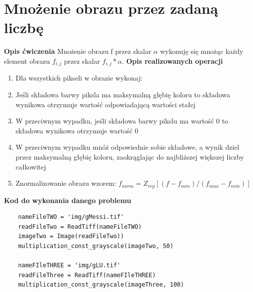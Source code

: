 \documentclass[magisterska,openany]{pracadypl}
\begin{document}
\newpage
\section{Mnożenie obrazu przez zadaną liczbę}

\vspace{0.5cm}\textbf{\Large Opis ćwiczenia}
\vspace{0.25cm}\newline
Mnożenie obrazu f przez skalar $\alpha$ wykonuję się mnożąc każdy element obrazu $f_{i,j}$ przez skalar $f_{i,j}*\alpha$.
\newline
\newline
\textbf{\Large Opis realizowanych operacji}
\begin{enumerate}
\item Dla wszystkich pikseli w obrazie wykonaj:  
\item Jeśli składowa barwy piksla ma maksymalną głębię koloru to składowa wynikowa otrzymuje wartość odpowiadającą wartości stałej
\item W przeciwnym wypadku, jeśli składowa barwy pikslu ma wartość 0 to składowa wynikowa otrzymuje wartość 0
\item W przeciwnym wypadku mnóż odpowiednie sobie składowe, a wynik dziel przez maksymalną głębię koloru, zaokrąglając do najbliższej większej liczby całkowitej
\item Znormalizowanie obrazu wzorem:
\newline $f_{norm}=Z_{rep}[(f-f_{min})/(f_{max}-f_{min})]$
\end{enumerate}

\vspace{0.5cm}
\textbf{\Large Kod do wykonania danego problemu}
\lstset{language=Python}
\vspace{0.25cm}
\begin{lstlisting}
	nameFileTWO = 'img/gMessi.tif'
	readFileTwo = ReadTiff(nameFileTWO)
	imageTwo = Image(readFileTwo))
	multiplication_const_grayscale(imageTwo, 50)	
	
	nameFIleTHREE = 'img/gLU.tif'
	readFileThree = ReadTiff(nameFIleTHREE)
	multiplication_const_grayscale(imageThree, 100)

\end{lstlisting}
\end{document}
